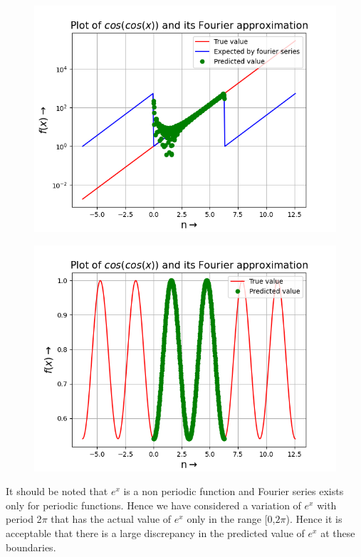 \documentclass{article}
\begin{document}
\begin{figure}[h!]
    \centering
    \includegraphics[scale=0.55]{q7(a).png}
    \label{fig:1(b)}
\end{figure}
\begin{figure}[h!]
    \centering
    \includegraphics[scale=0.55]{q7(b).png}
    \label{fig:1(b)}
\end{figure}

\newpage

It should be noted that $e^x$ is a non periodic function and Fourier series exists only for periodic functions. Hence we have considered a variation of $e^x$ with period 2$\pi$ that has the actual value of $e^x$ only in the range [0,$2\pi$). Hence it is acceptable that there is a large discrepancy in the predicted value of $e^x$ at these boundaries.
\end{document}
